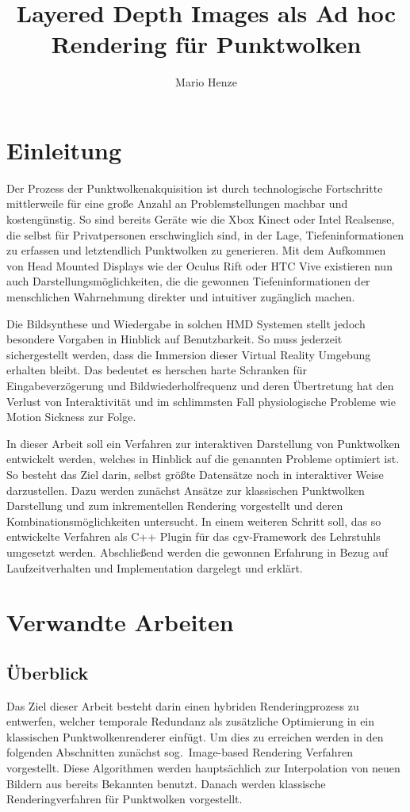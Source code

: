 \documentclass[hyperref, beleg, german]{cgvpub}
\author{Mario Henze}
\title{Layered Depth Images als Ad hoc Rendering für Punktwolken}
\begin{document}
\chapter{Einleitung}%
\label{sec:einleitung}

Der Prozess der Punktwolkenakquisition ist durch technologische Fortschritte
mittlerweile für eine große Anzahl an Problemstellungen machbar und
kostengünstig. So sind bereits Geräte wie die Xbox Kinect oder Intel
Realsense, die selbst für Privatpersonen erschwinglich sind, in der Lage,
Tiefeninformationen zu erfassen und letztendlich Punktwolken zu generieren. Mit
dem Aufkommen von Head Mounted Displays wie der Oculus Rift oder HTC Vive
existieren nun auch Darstellungsmöglichkeiten, die die gewonnen
Tiefeninformationen der menschlichen Wahrnehmung direkter und intuitiver
zugänglich machen.

Die Bildsynthese und Wiedergabe in solchen HMD Systemen stellt jedoch besondere
Vorgaben in Hinblick auf Benutzbarkeit. So muss jederzeit sichergestellt werden,
dass die Immersion dieser Virtual Reality Umgebung erhalten bleibt. Das bedeutet
es herschen harte Schranken für Eingabeverzögerung und Bildwiederholfrequenz und
deren Übertretung hat den Verlust von Interaktivität und im schlimmsten Fall
physiologische Probleme wie Motion Sickness zur Folge.

In dieser Arbeit soll ein Verfahren zur interaktiven Darstellung von
Punktwolken entwickelt werden, welches in Hinblick auf die genannten Probleme
optimiert ist. So besteht das Ziel darin, selbst größte Datensätze noch in
interaktiver Weise darzustellen. Dazu werden zunächst Ansätze zur klassischen
Punktwolken Darstellung und zum inkrementellen Rendering vorgestellt und deren
Kombinationsmöglichkeiten untersucht. In einem weiteren Schritt soll, das so
entwickelte Verfahren als C++ Plugin für das cgv-Framework des Lehrstuhls
umgesetzt werden. Abschließend werden die gewonnen Erfahrung in Bezug auf
Laufzeitverhalten und Implementation dargelegt und erklärt.

\chapter{Verwandte Arbeiten}%
\label{sec:verwandte_arbeiten}

\section{Überblick}

Das Ziel dieser Arbeit besteht darin einen hybriden Renderingprozess zu
entwerfen, welcher temporale Redundanz als zusätzliche Optimierung in ein
klassischen Punktwolkenrenderer einfügt. Um dies zu erreichen werden in den
folgenden Abschnitten zunächst sog.\ Image-based Rendering Verfahren
vorgestellt. Diese Algorithmen werden hauptsächlich zur Interpolation von neuen
Bildern aus bereits Bekannten benutzt. Danach werden klassische
Renderingverfahren für Punktwolken vorgestellt.
\end{document}
